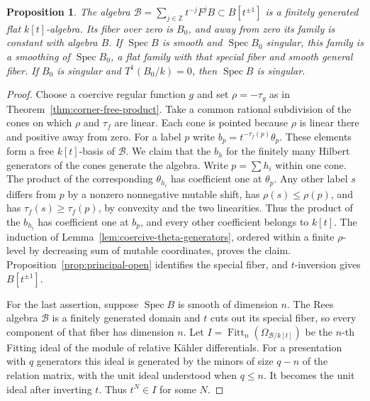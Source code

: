 \documentclass[11pt,reqno]{amsart}
\numberwithin{equation}{section}
\newtheorem{proposition}[theorem]{Proposition}
\theoremstyle{definition}
\theoremstyle{remark}
\DeclareMathOperator{\Spec}{Spec}
\begin{document}
\begin{proposition}\label{prop:principal-open-smoothability}
The algebra \(\mathcal B=\sum_{j\in\mathbb Z}t^{-j}F^jB\subset
B[t^{\pm1}]\) is a finitely generated flat \(k[t]\)-algebra. Its
fiber over zero is \(B_0\), and away from zero its family is constant
with algebra \(B\). If \(\Spec B\) is smooth and \(\Spec B_0\) singular,
this family is a \emph{smoothing} of \(\Spec B_0\), a flat family with
that special fiber and smooth general fiber. If \(B_0\)
is singular and \(T^1(B_0/k)=0\), then \(\Spec B\) is singular.
\end{proposition}
\begin{proof}
Choose a coercive regular function \(g\) and set \(\rho=-\tau_g\)
as in Theorem~\ref{thm:corner-free-product}. Take
a common rational subdivision of the cones on which \(\rho\) and
\(\tau_f\) are linear. Each cone is pointed because \(\rho\) is linear there and positive
away from zero. For a label \(p\) write \(b_p=t^{-\tau_f(p)}\theta_p\).
These elements form a free \(k[t]\)-basis of \(\mathcal B\).
We claim that the \(b_h\) for the finitely many Hilbert generators of
the cones generate the algebra. Write \(p=\sum h_i\) within one cone.
The product of the corresponding \(\theta_{h_i}\) has coefficient
one at \(\theta_p\). Any other label \(s\) differs from \(p\) by a
nonzero nonnegative mutable shift, has \(\rho(s)\le\rho(p)\), and
has \(\tau_f(s)\ge\tau_f(p)\), by convexity and the two linearities.
Thus the product of the \(b_{h_i}\) has coefficient one at \(b_p\),
and every other coefficient belongs to \(k[t]\). The induction
of Lemma~\ref{lem:coercive-theta-generators}, ordered within a finite
\(\rho\)-level by decreasing sum of mutable coordinates, proves the
claim. Proposition~\ref{prop:principal-open} identifies the special
fiber, and \(t\)-inversion gives \(B[t^{\pm1}]\).

For the last assertion, suppose \(\Spec B\) is smooth of dimension
\(n\). The Rees algebra \(\mathcal B\) is a finitely generated domain
and \(t\) cuts out its special fiber, so every component of that fiber
has dimension \(n\). Let \(I=\operatorname{Fitt}_n(\Omega_{\mathcal B/k[t]})\)
be the \(n\)-th Fitting ideal of the module of relative K\"ahler
differentials. For a presentation with \(q\) generators this ideal
is generated by the minors of size \(q-n\) of the relation matrix,
with the unit ideal understood when \(q\le n\). It becomes the
unit ideal after inverting \(t\). Thus \(t^N\in I\) for some \(N\).


\end{proof}
\end{document}

